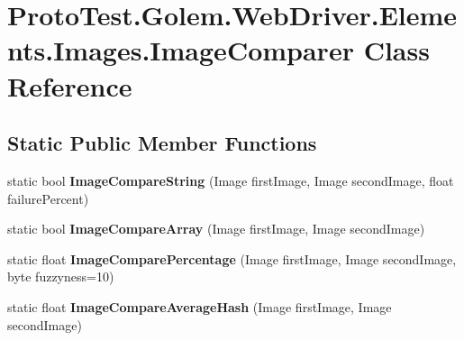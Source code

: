 \hypertarget{class_proto_test_1_1_golem_1_1_web_driver_1_1_elements_1_1_images_1_1_image_comparer}{\section{Proto\-Test.\-Golem.\-Web\-Driver.\-Elements.\-Images.\-Image\-Comparer Class Reference}
\label{class_proto_test_1_1_golem_1_1_web_driver_1_1_elements_1_1_images_1_1_image_comparer}
}
\subsection*{Static Public Member Functions}
\begin{DoxyCompactItemize}
\item 
\hypertarget{class_proto_test_1_1_golem_1_1_web_driver_1_1_elements_1_1_images_1_1_image_comparer_a245c507055cc2b5955392aed3cd60d01}{static bool {\bfseries Image\-Compare\-String} (Image first\-Image, Image second\-Image, float failure\-Percent)}\label{class_proto_test_1_1_golem_1_1_web_driver_1_1_elements_1_1_images_1_1_image_comparer_a245c507055cc2b5955392aed3cd60d01}

\item 
\hypertarget{class_proto_test_1_1_golem_1_1_web_driver_1_1_elements_1_1_images_1_1_image_comparer_a41667c784f75499101443189039c2d99}{static bool {\bfseries Image\-Compare\-Array} (Image first\-Image, Image second\-Image)}\label{class_proto_test_1_1_golem_1_1_web_driver_1_1_elements_1_1_images_1_1_image_comparer_a41667c784f75499101443189039c2d99}

\item 
\hypertarget{class_proto_test_1_1_golem_1_1_web_driver_1_1_elements_1_1_images_1_1_image_comparer_a6589574ac5c28bae8a7e510f78ce075b}{static float {\bfseries Image\-Compare\-Percentage} (Image first\-Image, Image second\-Image, byte fuzzyness=10)}\label{class_proto_test_1_1_golem_1_1_web_driver_1_1_elements_1_1_images_1_1_image_comparer_a6589574ac5c28bae8a7e510f78ce075b}

\item 
\hypertarget{class_proto_test_1_1_golem_1_1_web_driver_1_1_elements_1_1_images_1_1_image_comparer_a1af5aae2eb480602e929a9bcb5d66c4d}{static float {\bfseries Image\-Compare\-Average\-Hash} (Image first\-Image, Image second\-Image)}\label{class_proto_test_1_1_golem_1_1_web_driver_1_1_elements_1_1_images_1_1_image_comparer_a1af5aae2eb480602e929a9bcb5d66c4d}


\end{DoxyCompactItemize}
